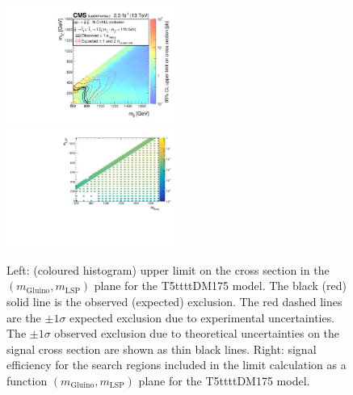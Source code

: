\begin{figure}[t]
  \begin{center}
    \includegraphics[width=0.49\textwidth]{supplementary/figures/RA1T5ttttDM175XSEC} \, 
    \includegraphics[width=0.49\textwidth]{supplementary/figures/T5ttttDM175_merging_4_cats} \,     
  \end{center}
  \caption{Left: (coloured histogram) upper limit on the cross section in the $(m_{\mathrm{Gluino}},m_{\mathrm{LSP}})$ plane for the T5ttttDM175 model. 
  The black (red) solid line is the observed (expected) exclusion. The red dashed lines are the $\pm1\sigma$ expected exclusion due to experimental uncertainties. 
  The $\pm1\sigma$ observed exclusion due to theoretical uncertainties on the signal cross section are shown as thin black lines. 
  Right: signal efficiency for the search regions included in the limit calculation as a function $(m_{\mathrm{Gluino}},m_{\mathrm{LSP}})$ plane for the T5ttttDM175 model. 
  \label{fig:T5ttttDM175_excl}}
\end{figure}


